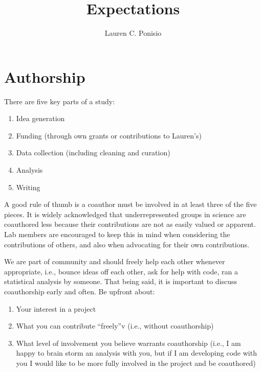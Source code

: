 \documentclass[12pt]{article}
\title{Expectations}
\author{Lauren C. Ponisio}
\begin{document}
\maketitle

\section{Authorship}
There are five key parts of a study:
\begin{enumerate}
\item Idea generation
\item Funding (through own grants or contributions to Lauren's)
\item Data collection (including cleaning and curation)
\item Analysis
\item Writing
\end{enumerate}

A good rule of thumb is a coauthor must be involved in at least three
of the five pieces. It is widely acknowledged that underrepresented
groups in science are coauthored less because their contributions are
not as easily valued or apparent. Lab members are encouraged to keep
this in mind when considering the contributions of others, and also
when advocating for their own contributions.

We are part of community and should freely help each other whenever
appropriate, i.e., bounce ideas off each other, ask for help with
code, ran a statistical analysis by someone. That being said, it is
important to discuss coauthorship early and often. Be upfront about:

\begin{enumerate}
\item Your interest in a project
\item What you can contribute ``freely''v (i.e., without coauthorship)
\item What level of involvement you believe warrants coauthorship
  (i.e., I am happy to brain storm an analysis with you, but if I am
  developing code with you I would like to be more fully involved in
  the project and be coauthored)
\end{enumerate}
\end{document}
